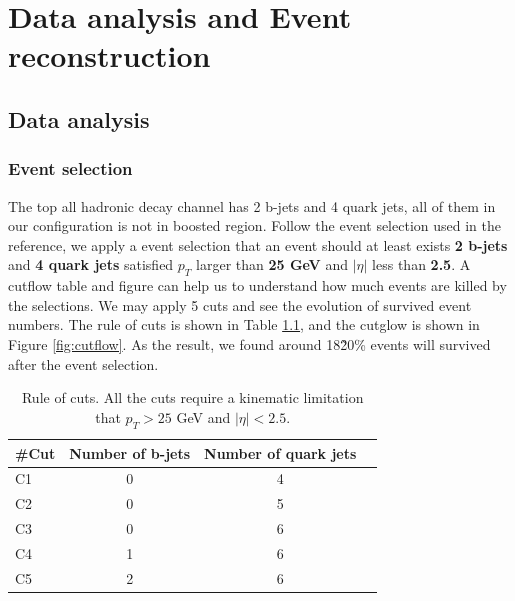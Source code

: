 \chapter{Data analysis and Event reconstruction}\label{section:Reconstruction}


\section{Data analysis}\label{sec:Data analysis}
\subsection{Event selection}\label{subsec:Event selection}
The top all hadronic decay channel has 2 b-jets and 4 quark jets, all of them in our configuration is not in boosted region. Follow the event selection used in the reference\cite{Mccarthy:2015ucy},  we apply a event selection that an event should at least exists \textbf{2 b-jets} and \textbf{4 quark jets} satisfied $p_{T}$ larger than \textbf{25 GeV} and $|\eta|$ less than \textbf{2.5}. A cutflow table and figure can help us to understand how much events are killed by the selections. We may apply 5 cuts and see the evolution of survived event numbers. The rule of cuts is shown in Table \ref{table:cuts}, and the cutglow is shown in Figure \ref{fig:cutflow}. As the result, we found around 18\~20\% events will survived after the event selection. 

\begin{center}
	\begin{table}[h]
		\begin{tabular}{p{} c c c }
			\cline{1-3}
			\#Cut    & Number of b-jets & Number of quark jets  \\
			\hline
			C1      &   0  & 4    \\
			C2      &   0  & 5    \\
			C3      &   0  & 6    \\
			C4      &   1  & 6    \\
			C5      &   2  & 6    \\
			\hline
		\end{tabular}
		\caption{Rule of cuts. All the cuts require a kinematic limitation that $p_{T} > 25$ GeV and $|\eta|<2.5$.}
		\label{table:cuts}
	\end{table}
\end{center}

